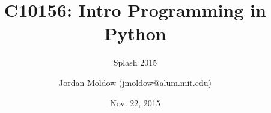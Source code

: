 \usepackage[english]{babel}

\usepackage[latin1]{inputenc}

\usepackage{times}
\usepackage[T1]{fontenc}
\usepackage{amsmath,amssymb,amsfonts}

\usepackage{textcomp, inputenc}
\renewcommand{\ttdefault}{pcr}

\renewcommand{\subject}{C10156: Intro Programming in Python}
\title %
{\subject}


\subtitle
{%
  Splash 2015%
}

\author %
{Jordan Moldow ({\ttfamily jmoldow@alum.mit.edu})
}


\date %
{Nov. 22, 2015}













\maketitle
\begin{frame}
  \titlepage
\end{frame}

